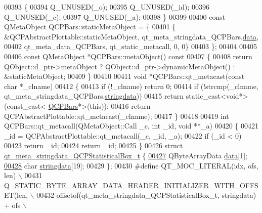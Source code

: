 \begin{DoxyCode}
00393 \{
00394     Q\_UNUSED(\_o);
00395     Q\_UNUSED(\_id);
00396     Q\_UNUSED(\_c);
00397     Q\_UNUSED(\_a);
00398 \}
00399 
00400 \textcolor{keyword}{const} QMetaObject QCPBars::staticMetaObject = \{
00401     \{ &QCPAbstractPlottable::staticMetaObject, qt\_meta\_stringdata\_QCPBars.\hyperlink{a00067_a5237dfd2ea3d5be916ce7c562d734ff4}{data},
00402       qt\_meta\_data\_QCPBars,  qt\_static\_metacall, 0, 0\}
00403 \};
00404 
00405 
00406 \textcolor{keyword}{const} QMetaObject *QCPBars::metaObject()\textcolor{keyword}{ const}
00407 \textcolor{keyword}{}\{
00408     \textcolor{keywordflow}{return} QObject::d\_ptr->metaObject ? QObject::d\_ptr->dynamicMetaObject() : &staticMetaObject;
00409 \}
00410 
00411 \textcolor{keywordtype}{void} *QCPBars::qt\_metacast(\textcolor{keyword}{const} \textcolor{keywordtype}{char} *\_clname)
00412 \{
00413     \textcolor{keywordflow}{if} (!\_clname) \textcolor{keywordflow}{return} 0;
00414     \textcolor{keywordflow}{if} (!strcmp(\_clname, qt\_meta\_stringdata\_QCPBars.\hyperlink{a00067_a07ece80e538a4239e2a3b6d4b9782407}{stringdata}))
00415         \textcolor{keywordflow}{return} \textcolor{keyword}{static\_cast<}\textcolor{keywordtype}{void}*\textcolor{keyword}{>}(\textcolor{keyword}{const\_cast<} \hyperlink{a00027}{QCPBars}*\textcolor{keyword}{>}(\textcolor{keyword}{this}));
00416     \textcolor{keywordflow}{return} QCPAbstractPlottable::qt\_metacast(\_clname);
00417 \}
00418 
00419 \textcolor{keywordtype}{int} QCPBars::qt\_metacall(QMetaObject::Call \_c, \textcolor{keywordtype}{int} \_id, \textcolor{keywordtype}{void} **\_a)
00420 \{
00421     \_id = QCPAbstractPlottable::qt\_metacall(\_c, \_id, \_a);
00422     \textcolor{keywordflow}{if} (\_id < 0)
00423         \textcolor{keywordflow}{return} \_id;
00424     \textcolor{keywordflow}{return} \_id;
00425 \}
\hypertarget{a00067_source_l00426}{}\hyperlink{a00067}{00426} \textcolor{keyword}{struct }\hyperlink{a00067_da/de7/a00210}{qt\_meta\_stringdata\_QCPStatisticalBox\_t} \{
\hypertarget{a00067_source_l00427}{}\hyperlink{a00067_a5e26535af2751ed72a5c0a296eff07f6}{00427}     QByteArrayData \hyperlink{a00067_a5e26535af2751ed72a5c0a296eff07f6}{data}[1];
\hypertarget{a00067_source_l00428}{}\hyperlink{a00067_a69ea5a8754685d08ddf21f3f6478bb52}{00428}     \textcolor{keywordtype}{char} \hyperlink{a00067_a69ea5a8754685d08ddf21f3f6478bb52}{stringdata}[19];
00429 \};
00430 \textcolor{preprocessor}{#define QT\_MOC\_LITERAL(idx, ofs, len) \(\backslash\)}
00431 \textcolor{preprocessor}{    Q\_STATIC\_BYTE\_ARRAY\_DATA\_HEADER\_INITIALIZER\_WITH\_OFFSET(len, \(\backslash\)}
00432 \textcolor{preprocessor}{    offsetof(qt\_meta\_stringdata\_QCPStatisticalBox\_t, stringdata) + ofs \(\backslash\)}

\end{DoxyCode}
